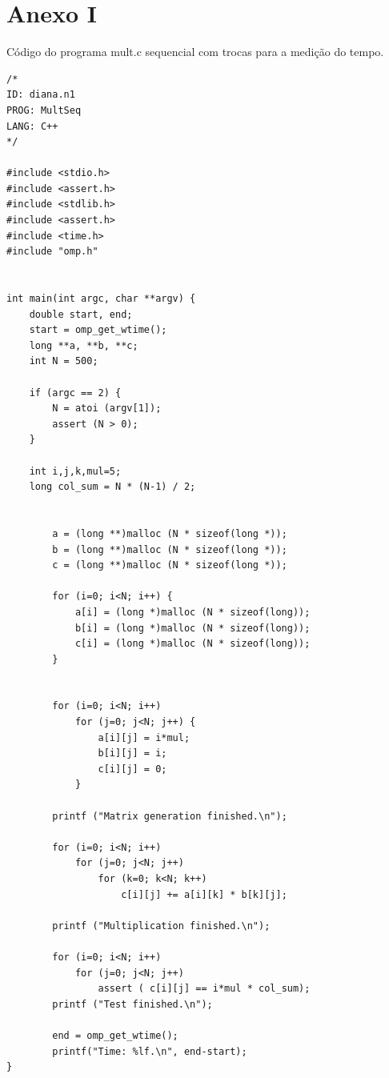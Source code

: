 \documentclass[a4paper,12pt,fleqn]{article}
\begin{document}
\clearpage 
 
   
 
\appendix 
 
\section{Anexo I} 
\label{anex1} 
 
Código do programa mult.c sequencial com trocas para a medição do tempo. 
\begin{verbatim} 
/*
ID: diana.n1
PROG: MultSeq
LANG: C++
*/

#include <stdio.h>
#include <assert.h>
#include <stdlib.h>
#include <assert.h>
#include <time.h>
#include "omp.h"


int main(int argc, char **argv) {
    double start, end; 
    start = omp_get_wtime();
    long **a, **b, **c;
    int N = 500;
	
    if (argc == 2) {
        N = atoi (argv[1]);
        assert (N > 0);
    }

    int i,j,k,mul=5;
    long col_sum = N * (N-1) / 2;
	
			
	    a = (long **)malloc (N * sizeof(long *));
	    b = (long **)malloc (N * sizeof(long *));
	    c = (long **)malloc (N * sizeof(long *));
	
	    for (i=0; i<N; i++) {
	        a[i] = (long *)malloc (N * sizeof(long));
	        b[i] = (long *)malloc (N * sizeof(long));
	        c[i] = (long *)malloc (N * sizeof(long));
	    }


	    for (i=0; i<N; i++)
	        for (j=0; j<N; j++) {
		        a[i][j] = i*mul;
	        	b[i][j] = i;
		        c[i][j] = 0;
	        }

	    printf ("Matrix generation finished.\n");         
	
	    for (i=0; i<N; i++)
	        for (j=0; j<N; j++)
		        for (k=0; k<N; k++)
		        	c[i][j] += a[i][k] * b[k][j];

	    printf ("Multiplication finished.\n");         
	
	    for (i=0; i<N; i++)
	        for (j=0; j<N; j++)
		        assert ( c[i][j] == i*mul * col_sum);  
        printf ("Test finished.\n");         

	    end = omp_get_wtime();
	    printf("Time: %lf.\n", end-start);
}
\end{verbatim}
 
\end{document}
